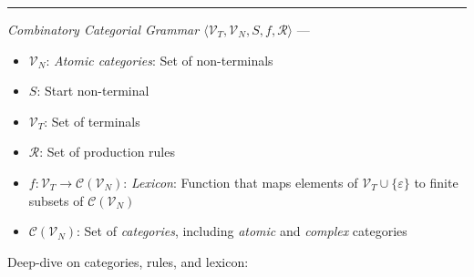 {\color{lightgray}\hrule height 0.001mm}

\emph{Combinatory Categorial Grammar $\langle \mathcal{V}_T, \mathcal{V}_N, S, f, \mathcal{R} \rangle$} --- 
\begin{itemize}
    \item $\mathcal{V}_N$: \emph{Atomic categories}: Set of non-terminals
    \item $S$: Start non-terminal
    \item $\mathcal{V}_T$: Set of terminals
    \item $\mathcal{R}$: Set of production rules 
    \item $f: \mathcal{V}_T \to \mathcal{C}(\mathcal{V}_N)$: \emph{Lexicon}: Function that maps elements of $\mathcal{V}_T \cup \{\varepsilon\}$ to finite subsets of $\mathcal{C}(\mathcal{V}_N)$ 
    \item $\mathcal{C}(\mathcal{V}_N)$: Set of \emph{categories}, including \emph{atomic} and \emph{complex} categories
\end{itemize}
Deep-dive on categories, rules, and lexicon:
